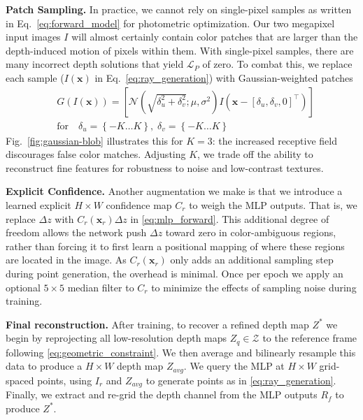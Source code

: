\vspace{0.5em}\noindent\textbf{Patch Sampling.}\hspace{0.1em}  In practice, we cannot rely on single-pixel samples as written in Eq.~\eqref{eq:forward_model} for photometric optimization. Our two megapixel input images $I$ will almost certainly contain color patches that are larger than the depth-induced motion of pixels within them. With single-pixel samples, there are many incorrect depth solutions that yield $\mathcal{L}_P$ of zero. To combat this, we replace each sample ($I(\bm{x})$ in Eq.~\eqref{eq:ray_generation}) with Gaussian-weighted patches
\begin{align}\label{eq:gaussian_blob}
    &G(I(\bm{x})) = \left[\mathcal{N}(\sqrt{\delta_u^2 + \delta_v^2};\mu,\sigma^2)I(\bm{x} - [\delta_u, \delta_v, 0]^\top)\right] \nonumber\\
    &\mathrm{for} \quad \delta_u = \left\{-K \ldots K\right\}, \;\delta_v = \left\{-K \ldots K\right\}
\end{align}
Fig.~\ref{fig:gaussian-blob} illustrates this for $K=3$: the increased receptive field discourages false color matches. Adjusting $K$, we trade off the ability to reconstruct fine features for robustness to noise and low-contrast textures.

\vspace{0.5em}\noindent\textbf{Explicit Confidence.}\hspace{0.1em}  Another augmentation we make is that we introduce a learned explicit $H\times W$ confidence map $C_r$ to weigh the MLP outputs. That is, we replace $\Delta z$ with $C_r(\bm{x}_r)\Delta z$ in \eqref{eq:mlp_forward}. This additional degree of freedom allows the network push $\Delta z$ toward zero in color-ambiguous regions, rather than forcing it to first learn a positional mapping of where these regions are located in the image. As $C_r(\bm{x}_r)$ only adds an additional sampling step during point generation, the overhead is minimal. Once per epoch we apply an optional $5\times5$ median filter to $C_r$ to minimize the effects of sampling noise during training.

\vspace{0.5em}\noindent\textbf{Final reconstruction.}\hspace{0.1em}  After training, to recover a refined depth map $Z^*$ we begin by reprojecting all low-resolution depth maps $Z_q \in \mathcal{Z}$ to the reference frame following \eqref{eq:geometric_constraint}. We then average and bilinearly resample this data to produce a $H\times W$ depth map $Z_{avg}$. We query the MLP at $H\times W$ grid-spaced points, using $I_r$ and $Z_{avg}$ to generate points as in \eqref{eq:ray_generation}. Finally, we extract and re-grid the depth channel from the MLP outputs $R_f$ to produce $Z^*$.


